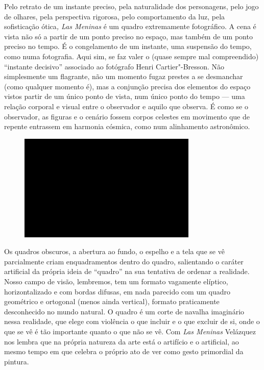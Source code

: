 Pelo retrato de um instante preciso, pela naturalidade dos personagens,
pelo jogo de olhares, pela perspectiva rigorosa, pelo comportamento da
luz, pela sofisticação ótica\emph{, Las Meninas} é um quadro
extremamente fotográfico. A cena é vista não só a partir de um ponto
preciso no espaço, mas também de um ponto preciso no tempo. É o
congelamento de um instante, uma suspensão do tempo, como numa
fotografia. Aqui sim, se faz valer o (quase sempre mal compreendido)
``instante decisivo'' associado ao fotógrafo Henri Cartier"-Bresson. Não
simplesmente um flagrante, não um momento fugaz prestes a se desmanchar
(como qualquer momento é), mas a conjunção precisa dos elementos do
espaço vistos partir de um único ponto de vista, num único ponto do
tempo --- uma relação corporal e visual entre o observador e aquilo que
observa. É como se o observador, as figuras e o cenário fossem corpos
celestes em movimento que de repente entrassem em harmonia cósmica, como
num alinhamento astronômico.

\begin{figure}[!ht]

\centering
 \includegraphics[width=85mm]{./imgs/im1.jpg}
\caption{\tiny{}}

\end{figure}

Os quadros obscuros, a abertura ao fundo, o espelho e a tela que se vê
parcialmente criam enquadramentos dentro do quadro, salientando o
caráter artificial da própria ideia de ``quadro'' na sua tentativa de
ordenar a realidade. Nosso campo de visão, lembremos, tem um formato
vagamente elíptico, horizontalizado e com bordas difusas, em nada
parecido com um quadro geométrico e ortogonal (menos ainda vertical),
formato praticamente desconhecido no mundo natural. O quadro é um corte
de navalha imaginário nessa realidade, que elege com violência o que
incluir e o que excluir de si, onde o que se vê é tão importante quanto
o que não se vê. Com \emph{Las Meninas}
Velázquez nos lembra que na própria natureza da arte está o artifício e
o artificial, ao mesmo tempo em que celebra o próprio ato de ver como
gesto primordial da pintura.

